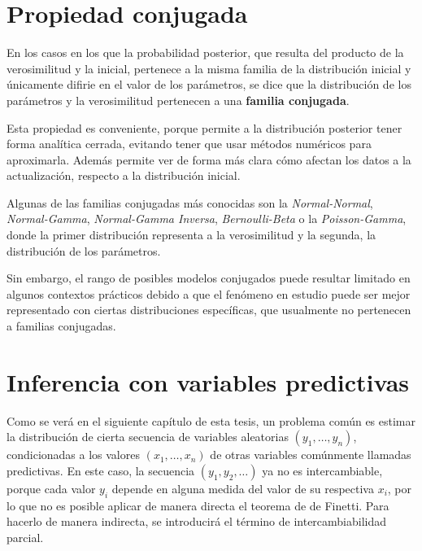 \section{Propiedad conjugada}

En los casos en los que la probabilidad posterior, que resulta del producto de la verosimilitud y la inicial, pertenece a la misma familia de la distribuci\'on inicial y \'unicamente difirie en el valor de los par\'ametros, se dice que la distribuci\'on de los par\'ametros y la verosimilitud pertenecen a una \textbf{familia conjugada}.

Esta propiedad es conveniente, porque permite a la distribuci\'on posterior tener forma anal\'itica cerrada, evitando tener que usar m\'etodos num\'ericos para aproximarla. Adem\'as permite ver de forma m\'as clara c\'omo afectan los datos a la actualizaci\'on, respecto a la distribuci\'on inicial.

Algunas de las familias conjugadas m\'as conocidas son la \textit{Normal-Normal}, \textit{Normal-Gamma}, \textit{Normal-Gamma Inversa}, \textit{Bernoulli-Beta} o la \textit{Poisson-Gamma}, donde la primer distribuci\'on representa a la verosimilitud y la segunda, la distribuci\'on de los par\'ametros. 

Sin embargo, el rango de posibles modelos conjugados puede resultar limitado en algunos contextos pr\'acticos debido a que el fen\'omeno en estudio puede ser mejor representado con ciertas distribuciones espec\'ificas, que usualmente no pertenecen a familias conjugadas.

\section[Inferencia con variables predictivas]{Inferencia con variables predictivas\raisebox{.3\baselineskip}{\normalsize\footnotemark}}

Como se ver\'a en el siguiente cap\'itulo de esta tesis, un problema com\'un es estimar la distribuci\'on de cierta secuencia de variables aleatorias $(y_1,\ldots,y_n)$, condicionadas a los valores $(x_1,\ldots,x_n)$ de otras variables com\'unmente llamadas predictivas. En este caso, la secuencia $(y_1,y_2,\ldots)$ ya no es intercambiable, porque cada valor $y_i$ depende en alguna medida del valor de su respectiva $x_i$, por lo que no es posible aplicar de manera directa el teorema de de Finetti. Para hacerlo de manera indirecta, se introducir\'a el t\'ermino de intercambiabilidad parcial.

